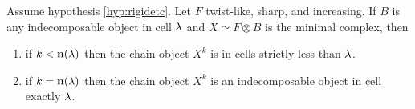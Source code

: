 
\begin{proposition}\label{prop:tailProperty}
Assume hypothesis \ref{hyp:rigidetc}. Let $F$ twist-like, sharp, and increasing. If $B$ is any indecomposable object in cell $\lambda$ and $X\simeq F\otimes B$ is the minimal complex, then
\begin{enumerate}
\item if $k<{\mathbf n}(\lambda)$ then the chain object $X^k$ is in cells strictly less than $\lambda$.
\item if $k={\mathbf n}(\lambda)$ then the chain object $X^k$ is an indecomposable object in cell exactly $\lambda$.
\end{enumerate}
\end{proposition}


